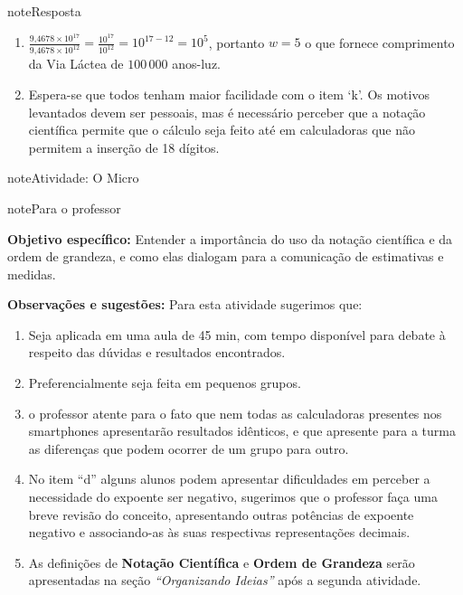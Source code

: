 \begin{sphinxadmonition}{note}{Resposta}
\begin{enumerate}
\item {} 
\(\frac{9\text{,}4678 \times 10^{17}}{9\text{,}4678 \times 10^{12}}=\frac{10^{17}}{10^{12}} = 10^{17-12} = 10^5\), portanto \(w=5\) o que fornece comprimento da Via Láctea de  \(100\, 000\) anos-luz.

\item {} 
Espera-se que todos tenham maior facilidade com o item ‘k’. Os motivos levantados devem ser pessoais, mas é necessário perceber que a notação científica permite que o cálculo seja feito até em calculadoras que não permitem a inserção de 18 dígitos.

\end{enumerate}
\end{sphinxadmonition}
\label{\detokenize{NO103-3:sub-ativ-micro}}
\begin{sphinxadmonition}{note}{Atividade: O Micro}

\begin{sphinxadmonition}{note}{Para o professor}

\textbf{Objetivo específico:} Entender a importância do uso da notação científica e da ordem de grandeza, e como elas dialogam para a comunicação de estimativas e medidas.

\textbf{Observações e sugestões:}
Para esta atividade sugerimos que:
\begin{enumerate}
\item {} 
Seja aplicada em uma aula de 45 min, com tempo disponível para debate à respeito das dúvidas e resultados encontrados.

\item {} 
Preferencialmente seja feita em pequenos grupos.

\item {} 
o professor atente para o fato que nem todas as calculadoras presentes nos smartphones apresentarão resultados idênticos, e que apresente para a turma as diferenças que podem ocorrer de um grupo para outro.

\item {} 
No item “d” alguns alunos podem apresentar dificuldades em perceber a necessidade do expoente ser negativo, sugerimos que o professor faça uma breve revisão do conceito, apresentando outras potências de expoente negativo e associando-as às suas respectivas representações decimais.

\item {} 
As definições de \textbf{Notação Científica} e \textbf{Ordem de Grandeza} serão apresentadas na seção \textit{“Organizando Ideias”} após a segunda atividade.


\end{enumerate}
\end{sphinxadmonition}
\end{sphinxadmonition}
